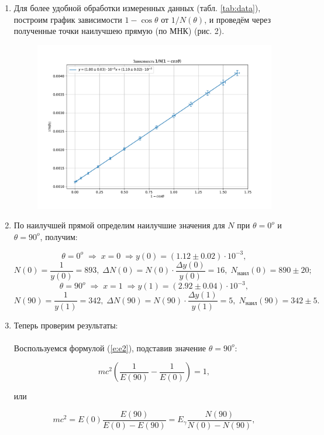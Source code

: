 \documentclass[a4paper,12pt]{article}
\begin{document}
\begin{enumerate}
\item Для более удобной обработки измеренных данных (табл. \ref{tab:data}), построим график зависимости $1 - \cos{\theta}$ от $1/N(\theta)$, и проведём через полученные точки наилучшею прямую (по МНК) (рис. 2). 
\begin{figure}[h!]
\centering
\includegraphics[scale=0.6]{plot_5_1_2 .pdf} 
\end{figure}

\item По наилучшей прямой определим наилучшие значения для $N$ при $\theta = 0^o$ и $\theta = 90^o$, получим:

\[
\theta = 0^o \; \Rightarrow \; x = 0 \; \Rightarrow y(0) = (1.12 \pm 0.02) \cdot 10^{-3},
\]\[
N(0) = \frac{1}{y(0)} = 893, \; \Delta N(0) = N(0) \cdot \frac{\Delta y(0)}{y(0)} = 16, \; N_\text{наил}(0) = 890 \pm 20;
\]\[
\theta = 90^o \; \Rightarrow \; x = 1 \; \Rightarrow y(1) = (2.92 \pm 0.04) \cdot 10^{-3},
\]\[
N(90) = \frac{1}{y(1)} = 342, \; \Delta N(90) = N(90) \cdot \frac{\Delta y(1)}{y(1)} = 5, \;
N_\text{наил}(90) = 342 \pm 5.
\]
\item Теперь проверим результаты:
\paragraph{} Воспользуемся формулой (\ref{e:e2}), подставив значение $\theta = 90^o$:

\[
mc^2 \left( \frac{1}{E(90)} - \frac{1}{E(0)} \right) = 1,
\]

\noindent или

\[
mc^2 = E(0)\frac{E(90)}{E(0) - E(90)} = E_\gamma \frac{N(90)}{N(0) - N(90)},
\]


\end{enumerate}
\end{document}
